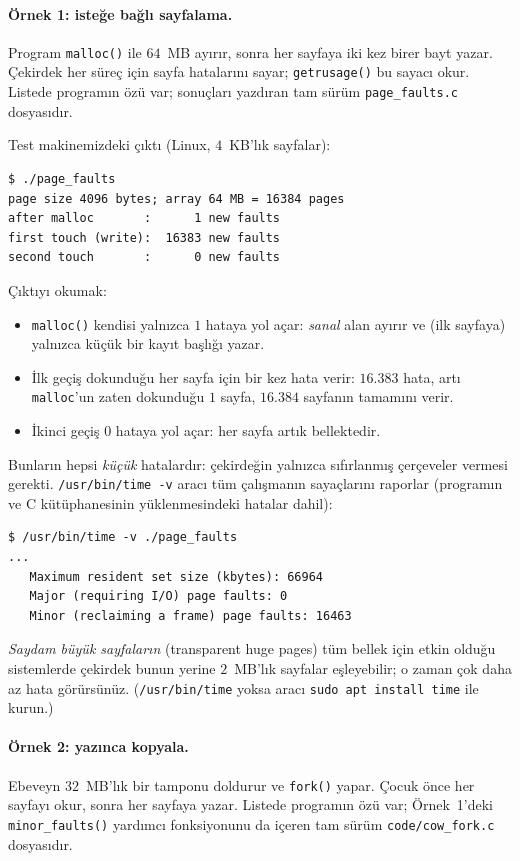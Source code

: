\documentclass[11pt,a4paper]{article}
\newcommand{\cmd}[1]{\texttt{#1}}
\begin{document}
\paragraph{Örnek 1: isteğe bağlı sayfalama.} Program \cmd{malloc()} ile $64$~MB ayırır, sonra her sayfaya iki kez birer bayt yazar. Çekirdek her süreç için sayfa hatalarını sayar; \cmd{getrusage()} bu sayacı okur. Listede programın özü var; sonuçları yazdıran tam sürüm \cmd{page\_faults.c} dosyasıdır.



Test makinemizdeki çıktı (Linux, $4$~KB'lık sayfalar):
\begin{lstlisting}[style=term]
$ ./page_faults
page size 4096 bytes; array 64 MB = 16384 pages
after malloc       :      1 new faults
first touch (write):  16383 new faults
second touch       :      0 new faults
\end{lstlisting}

Çıktıyı okumak:
\begin{itemize}
  \item \cmd{malloc()} kendisi yalnızca $1$ hataya yol açar: \emph{sanal} alan ayırır ve (ilk sayfaya) yalnızca küçük bir kayıt başlığı yazar.
  \item İlk geçiş dokunduğu her sayfa için bir kez hata verir: $16.383$ hata, artı \cmd{malloc}'un zaten dokunduğu $1$ sayfa, $16.384$ sayfanın tamamını verir.
  \item İkinci geçiş $0$ hataya yol açar: her sayfa artık bellektedir.
\end{itemize}
Bunların hepsi \emph{küçük} hatalardır: çekirdeğin yalnızca sıfırlanmış çerçeveler vermesi gerekti. \cmd{/usr/bin/time -v} aracı tüm çalışmanın sayaçlarını raporlar (programın ve C kütüphanesinin yüklenmesindeki hatalar dahil):
\begin{lstlisting}[style=term]
$ /usr/bin/time -v ./page_faults
...
   Maximum resident set size (kbytes): 66964
   Major (requiring I/O) page faults: 0
   Minor (reclaiming a frame) page faults: 16463
\end{lstlisting}
\emph{Saydam büyük sayfaların} (transparent huge pages) tüm bellek için etkin olduğu sistemlerde çekirdek bunun yerine $2$~MB'lık sayfalar eşleyebilir; o zaman çok daha az hata görürsünüz. (\cmd{/usr/bin/time} yoksa aracı \cmd{sudo apt install time} ile kurun.)

\paragraph{Örnek 2: yazınca kopyala.} Ebeveyn $32$~MB'lık bir tamponu doldurur ve \cmd{fork()} yapar. Çocuk önce her sayfayı okur, sonra her sayfaya yazar. Listede programın özü var; Örnek~1'deki \cmd{minor\_faults()} yardımcı fonksiyonunu da içeren tam sürüm \cmd{code/cow\_fork.c} dosyasıdır.
\end{document}
